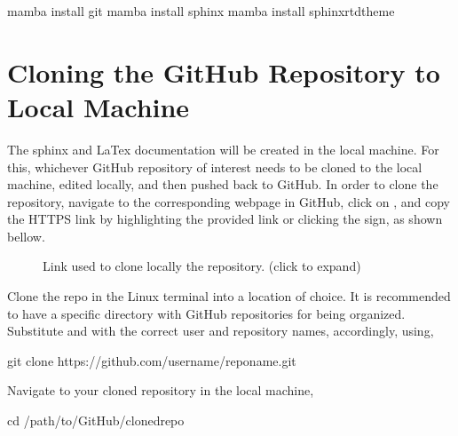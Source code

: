 \documentclass[letterpaper,10pt,english]{sphinxhowto}
\let\sphinxpxdimen\pdfpxdimen\else\newdimen\sphinxpxdimen
\begin{document}
\begin{sphinxVerbatim}[commandchars=\\\{\}]
\PYGZdl{} mamba install git
\PYGZdl{} mamba install sphinx
\PYGZdl{} mamba install sphinx\PYGZus{}rtd\PYGZus{}theme
\end{sphinxVerbatim}


\section{Cloning the GitHub Repository to Local Machine}
\label{\detokenize{index:cloning-the-github-repository-to-local-machine}}
\sphinxAtStartPar
The sphinx and LaTex documentation will be created in the local machine. For this, whichever GitHub repository of interest needs to be cloned to the local machine, edited locally, and then pushed back to GitHub. In order to clone the repository, navigate to the corresponding webpage in GitHub, click on , and copy the HTTPS link by highlighting the provided link or clicking the  sign, as shown bellow.

\begin{figure}[htbp]
\centering
\capstart

\noindent\sphinxincludegraphics[width=600\sphinxpxdimen]{{github_repo_clone}.png}
\caption{Link used to clone locally the repository. (click to expand)}\label{\detokenize{index:id1}}\end{figure}

\sphinxAtStartPar
Clone the repo in the Linux terminal into a location of choice. It is recommended to have a specific directory with GitHub repositories for being organized. Substitute  and  with the correct user and repository names, accordingly, using,

\begin{sphinxVerbatim}[commandchars=\\\{\}]
\PYGZdl{} git clone https://github.com/\PYGZlt{}user\PYGZhy{}name\PYGZgt{}/\PYGZlt{}repo\PYGZhy{}name\PYGZgt{}.git
\end{sphinxVerbatim}

\sphinxAtStartPar
Navigate to your cloned repository in the local machine,

\begin{sphinxVerbatim}[commandchars=\\\{\}]
\PYGZdl{} cd /path/to/GitHub/cloned\PYGZhy{}repo
\end{sphinxVerbatim}
\end{document}

